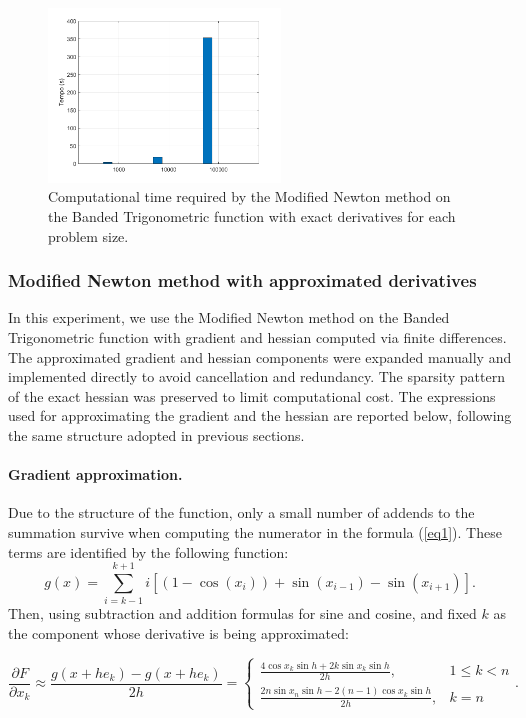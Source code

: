 \documentclass[a4paper,12pt]{article}
\begin{document}
	\begin{figure}[H]%
		\centering
		\includegraphics[width=0.55\textwidth]{../immagini/banded_time.png}
		\caption{Computational time required by the Modified Newton method on the Banded Trigonometric function with exact derivatives for each problem size.}
		\label{fig:bt_time_exact}
	\end{figure}
	
	\newpage
	

	\subsubsection{Modified Newton method with approximated derivatives}
	
	In this experiment, we use the Modified Newton method on the Banded Trigonometric function with gradient and hessian computed via finite differences. The approximated gradient and hessian components were expanded manually and implemented directly to avoid cancellation and redundancy. The sparsity pattern of the exact hessian was preserved to limit computational cost. The expressions used for approximating the gradient and the hessian are reported below, following the same structure adopted in previous sections.
	\paragraph{Gradient approximation.}
	Due to the structure of the function, only a small number of addends to the summation survive when computing the numerator in the formula (\ref{eq1}). These terms are identified by the following function: 
	\[
	g(x) = \sum_{i=k-1}^{k+1} i \left[ (1 - \cos(x_i)) + \sin(x_{i-1}) - \sin(x_{i+1}) \right].	
	\] 
	Then, using subtraction and addition formulas for sine and cosine, and fixed $k$ as the component whose derivative is being approximated:
	
	\begin{equation}
		\frac{\partial F}{\partial x_k} \approx \frac{g(x+he_{k}) - g(x+he_{k})}{2h} = \begin{cases}
			\frac{4 \cos x_k\sin h + 2k\sin x_k\sin h}{2h}, & 1 \leq k < n \\
			\frac{2n\sin x_n\sin h - 2(n-1) \cos x_k\sin h}{2h}, & k = n
		\end{cases}.
	\end{equation}
	
\end{document}

